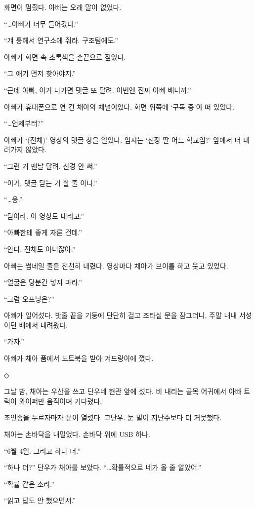 \documentclass[
  korean,
  letterpaper,
  twoside,
  open=any,
  fontsize=12.5pt,
  headings=small]{scrbook}
\begin{document}
화면이 멈췄다. 아빠는 오래
말이 없었다.

``\ldots 아빠가 너무
들어갔다.''

``걔 통해서 연구소에 줘라.
구조팀에도.''

아빠가 화면 속 초록색을
손끝으로 짚었다.

``그 애기 먼저 찾아야지.''

``근데 아빠, 이거 나가면 댓글
또 달려. 이번엔 진짜 아빠
배니까.''

아빠가 휴대폰으로 연 건 채아의
채널이었다. 화면 위쪽에 `구독
중'이 떠 있었다.

``\ldots 언제부터?''

아빠가 `(전체)' 영상의 댓글
창을 열었다. 엄지는 `선장 딸
어느 학교임?' 앞에서 더
내려가지 않았다.

``그런 거 맨날 달려. 신경 안
써.''

``이거, 댓글 닫는 거 할 줄
아냐.''

``\ldots 응.''

``닫아라. 이 영상도 내리고.''

``아빠한테 좋게 자른 건데.''

``안다. 전체도 아니잖아.''

아빠는 썸네일 줄을 천천히
내렸다. 영상마다 채아가 브이를
하고 웃고 있었다.

``얼굴은 당분간 넣지 마라.''

``그럼 오프닝은?''

아빠가 일어섰다. 밧줄 끝을
기둥에 단단히 걸고 조타실 문을
잠그더니, 주말 내내 서성이던
배에서 내려왔다.

``가자.''

아빠가 채아 품에서 노트북을
받아 겨드랑이에 꼈다.

\begin{center}◇\end{center}\nopagebreak

그날 밤, 채아는 우산을 쓰고
단우네 현관 앞에 섰다. 비
내리는 골목 어귀에서 아빠
트럭이 와이퍼만 움직이며
기다렸다.

초인종을 누르자마자 문이
열렸다. 고단우. 눈 밑이
지난주보다 더 거뭇했다.

채아는 손바닥을 내밀었다.
손바닥 위에 USB 하나.

``6월 4일. 그리고 하나 더.''

``하나 더?'' 단우가 채아를
보았다. ``\ldots 확률적으로
네가 올 줄 알았어.''

``확률 같은 소리.''

``읽고 답도 안 했으면서.''
\end{document}
